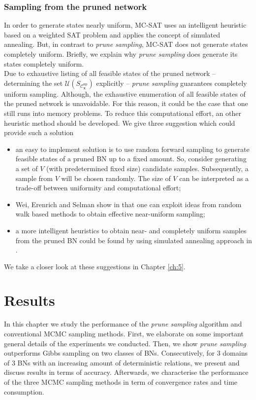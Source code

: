 \documentclass[a4paper, twoside, 11pt]{report}
\newcommand{\bfx}{{\mathbf{x}}}
\newcommand{\C}{{\mathcal C}}
\newcommand{\U}{{\mathcal{U}}}
\theoremstyle{plain}
\theoremstyle{definition}
\theoremstyle{remark}
\newcommand{\ps}{\textit{prune sampling }}
\begin{document}
\subsection{Sampling from the pruned network}
In order to generate states nearly uniform, MC-SAT uses an intelligent heuristic \cite{wei2004towards} based on a weighted SAT problem and applies the concept of simulated annealing. But, in contrast to \textit{prune sampling}, MC-SAT does not generate states completely uniform. Briefly, we explain why \ps does generate its states completely uniform.\\

Due to exhaustive listing of all feasible states of the pruned network -- determining the set $\U(S_{\C_\bfx^{\text{np}}})$ explicitly -- \ps guarantees completely uniform sampling. Although, the exhaustive enumeration of all feasible states of the pruned network is unavoidable. For this reason, it could be the case that one still runs into memory problems. To reduce this computational effort, an other heuristic method should be developed. We give three suggestion which could provide such a solution
\begin{itemize}
\item an easy to implement solution is to use random forward sampling to generate feasible states of a pruned BN up to a fixed amount. So, consider generating a set of $V$ (with predetermined fixed size) candidate samples. Subsequently, a sample from $V$ will be chosen randomly. The size of $V$ can be interpreted as a trade-off between uniformity and computational effort;
\item Wei, Erenrich and Selman show in \cite{wei2004towards} that one can exploit ideas from random walk based methods to obtain effective near-uniform sampling;
\item a more intelligent heuristics to obtain near- and completely uniform samples from the pruned BN could be found by using simulated annealing approach in \cite{wei2004towards}.
\end{itemize}
We take a closer look at these suggestions in Chapter \ref{ch:5}.



\chapter{Results}
In this chapter we study the performance of the \ps algorithm and conventional MCMC sampling methods. First, we elaborate on some important general details of the experiments we conducted. Then, we show \ps outperforms Gibbs sampling on two classes of BNs. Consecutively, for 3 domains of 3 BNs with an increasing amount of deterministic relations, we present and discuss results in terms of accuracy. Afterwards, we characterise the performance of the three MCMC sampling methods in term of convergence rates and time consumption.
\end{document}
